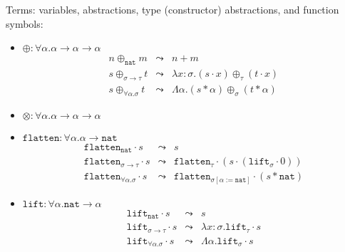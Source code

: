 \documentclass[10pt,presentation,color=names]{beamer}
\newcommand{\arrtype}{\rightarrow}
\newcommand{\quant}[2]{\forall #1.#2}
\newcommand{\app}[2]{#1 \cdot #2}
\newcommand{\tapp}[2]{#1 * #2}
\newcommand{\subst}[2]{#1:=#2}
\newcommand{\abs}[2]{\lambda #1.#2}
\newcommand{\tabs}[2]{\Lambda #1.#2}
\newcommand{\arrW}{\leadsto}
\newcommand{\nat}{\mathtt{nat}}
\newcommand{\flatten}{\mathtt{flatten}}
\newcommand{\lift}{\mathtt{lift}}
\begin{document}
\begin{frame}
  Terms: variables, abstractions, type (constructor) abstractions, and
  function symbols\pause:
  \begin{itemize}
  \item $\oplus : \forall \alpha . \alpha \arrtype \alpha \arrtype
    \alpha$\pause
    \[
    \begin{array}{rcl}
      n \oplus_{\nat} m &\arrW& n+m\\
      s \oplus_{\sigma \arrtype \tau} t &\arrW&
      \abs{x:\sigma}{(\app{s}{x}) \oplus_\tau (\app{t}{x})}\\
      s \oplus_{\quant{\alpha}{\sigma}} t &\arrW&
      \tabs{\alpha}{(\tapp{s}{\alpha}) \oplus_\sigma (\tapp{t}{\alpha})}
    \end{array}
    \]\pause
  \item $\otimes : \forall \alpha . \alpha \arrtype \alpha \arrtype
    \alpha$\pause
  \item $\flatten : \forall \alpha . \alpha \arrtype \nat$\pause
    \[
    \begin{array}{rcl}
      \app{\flatten_\nat}{s} &\arrW& s\\
      \app{\flatten_{\sigma \arrtype \tau}}{s} &\arrW& \app{\flatten_\tau}{(\app{s}{(\app{\lift_\sigma}{0})})}\\
      \app{\flatten_{\quant{\alpha}{\sigma}}}{s} &\arrW& \app{\flatten_{\sigma[\subst{\alpha}{\nat}]}}{(\tapp{s}{\nat})}
    \end{array}
    \]\pause
  \item $\lift : \forall \alpha . \nat \arrtype \alpha$\pause
    \[
    \begin{array}{rcl}
      \app{\lift_\nat}{s} &\arrW& s\\
      \app{\lift_{\sigma \arrtype \tau}}{s} &\arrW& \abs{x:\sigma}{\app{\lift_{\tau}}{s}}\\
      \app{\lift_{\quant{\alpha}{\sigma}}}{s} &\arrW& \tabs{\alpha}{\app{\lift_{\sigma}}{s}}
    \end{array}
    \]
  \end{itemize}
\end{frame}
\end{document}
